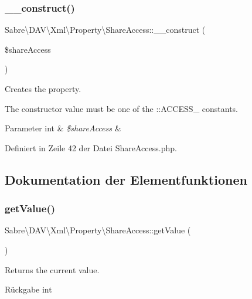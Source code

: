 \subsubsection{\texorpdfstring{\+\_\+\+\_\+construct()}{\_\_construct()}}
{\footnotesize\ttfamily Sabre\textbackslash{}\+D\+A\+V\textbackslash{}\+Xml\textbackslash{}\+Property\textbackslash{}\+Share\+Access\+::\+\_\+\+\_\+construct (\begin{DoxyParamCaption}\item[{}]{\$share\+Access }\end{DoxyParamCaption})}

Creates the property.

The constructor value must be one of the \+::\+A\+C\+C\+E\+S\+S\+\_\+ constants.


\begin{DoxyParams}[1]{Parameter}
int & {\em \$share\+Access} & \\
\hline
\end{DoxyParams}


Definiert in Zeile 42 der Datei Share\+Access.\+php.



\subsection{Dokumentation der Elementfunktionen}
\mbox{\label{class_sabre_1_1_d_a_v_1_1_xml_1_1_property_1_1_share_access_a96845e61098d847609ddc3bd08a4d1d3}} 
\subsubsection{\texorpdfstring{get\+Value()}{getValue()}}
{\footnotesize\ttfamily Sabre\textbackslash{}\+D\+A\+V\textbackslash{}\+Xml\textbackslash{}\+Property\textbackslash{}\+Share\+Access\+::get\+Value (\begin{DoxyParamCaption}{ }\end{DoxyParamCaption})}

Returns the current value.

\begin{DoxyReturn}{Rückgabe}
int 
\end{DoxyReturn}



